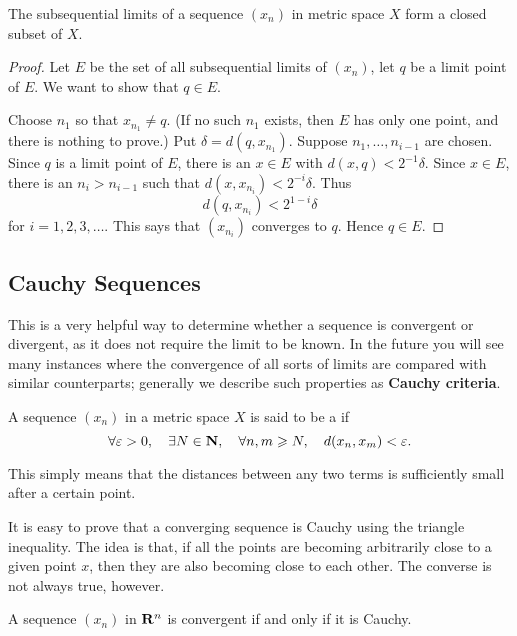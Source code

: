 \begin{proposition}
The subsequential limits of a sequence $(x_n)$ in metric space $X$ form a closed subset of $X$.
\end{proposition}

\begin{proof}
Let $E$ be the set of all subsequential limits of $(x_n)$, let $q$ be a limit point of $E$. We want to show that $q\in E$.

Choose $n_1$ so that $x_{n_1}\neq q$. (If no such $n_1$ exists, then $E$ has only one point, and there is nothing to prove.) Put $\delta=d(q,x_{n_1})$. Suppose $n_1,\dots,n_{i-1}$ are chosen. Since $q$ is a limit point of $E$, there is an $x\in E$ with $d(x,q)<2^{-1}\delta$. Since $x\in E$, there is an $n_i>n_{i-1}$ such that $d(x,x_{n_i})<2^{-i}\delta$. Thus
\[d(q,x_{n_i})<2^{1-i}\delta\]
for $i=1,2,3,\dots$. This says that $(x_{n_i})$ converges to $q$. Hence $q\in E$.
\end{proof}

\subsection{Cauchy Sequences}
This is a very helpful way to determine whether a sequence is convergent or divergent, as it does not require the limit to be known. In the future you will see many instances where the convergence of all sorts of limits are compared with similar counterparts; generally we describe such properties as \textbf{Cauchy criteria}.

\begin{definition}
A sequence $(x_n)$ in a metric space $X$ is said to be a  if 
\[\forall\varepsilon>0,\quad\exists N\in\mathbf N,\quad\forall n,m\geqslant N,\quad d(x_n,x_m)<\varepsilon.\]
\end{definition}

\begin{remark}
This simply means that the distances between any two terms is sufficiently small after a certain point.
\end{remark}

It is easy to prove that a converging sequence is Cauchy using the triangle inequality. The idea is that, if all the points are becoming arbitrarily close to a given point $x$, then they are also becoming close to each other. The converse is not always true, however.

\begin{proposition}
A sequence $(x_n)$ in $\mathbf R^n$ is convergent if and only if it is Cauchy.
\end{proposition}

